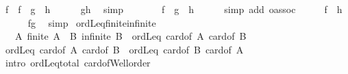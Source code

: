 \begin{isabellebody}
\ {\isachardoublequoteopen}f\ {\isacharequal}{\kern0pt}\ f\ {\isasymcirc}\ {\isacharparenleft}{\kern0pt}g\ {\isasymcirc}\ h{\isacharparenright}{\kern0pt}{\isachardoublequoteclose}\isanewline
\ \ \ \ \isamarkupfalse%
\ gh\ \isamarkupfalse%
\ simp\isanewline
\ \ \isamarkupfalse%
\ \isamarkupfalse%
\ {\isachardoublequoteopen}{\isasymdots}\ {\isacharequal}{\kern0pt}\ {\isacharparenleft}{\kern0pt}f\ {\isasymcirc}\ g{\isacharparenright}{\kern0pt}\ {\isasymcirc}\ h{\isachardoublequoteclose}\isanewline
\ \ \ \ \isamarkupfalse%
\ {\isacharparenleft}{\kern0pt}simp\ add{\isacharcolon}{\kern0pt}\ o{\isacharunderscore}{\kern0pt}assoc{\isacharparenright}{\kern0pt}\isanewline
\ \ \isamarkupfalse%
\ \isamarkupfalse%
\ {\isachardoublequoteopen}f\ {\isacharequal}{\kern0pt}\ h{\isachardoublequoteclose}\isanewline
\ \ \ \ \isamarkupfalse%
\ fg\ \isamarkupfalse%
\ simp\isanewline
{}\isamarkupfalse%
%
\endisatagproof
{\isafoldproof}%
%
\isadelimproof
\isanewline
%
\endisadelimproof
\isanewline
{}\isamarkupfalse%
\ ordLeq{}{\isacharunderscore}{\kern0pt}finite{\isacharunderscore}{\kern0pt}infinite{\isacharcolon}{\kern0pt}\isanewline
\ \ \ A{\isacharcolon}{\kern0pt}\ {\isachardoublequoteopen}finite\ A{\isachardoublequoteclose}\ \ B{\isacharcolon}{\kern0pt}\ {\isachardoublequoteopen}infinite\ B{\isachardoublequoteclose}\ \ {\isachardoublequoteopen}ordLeq{}\ {\isacharparenleft}{\kern0pt}card{\isacharunderscore}{\kern0pt}of\ A{\isacharparenright}{\kern0pt}\ {\isacharparenleft}{\kern0pt}card{\isacharunderscore}{\kern0pt}of\ B{\isacharparenright}{\kern0pt}{\isachardoublequoteclose}\isanewline
%
\isadelimproof
%
\endisadelimproof
%
\isatagproof
{}\isamarkupfalse%
\ {\isacharminus}{\kern0pt}\isanewline
\ \ \isamarkupfalse%
\ {\isacartoucheopen}ordLeq{}\ {\isacharparenleft}{\kern0pt}card{\isacharunderscore}{\kern0pt}of\ A{\isacharparenright}{\kern0pt}\ {\isacharparenleft}{\kern0pt}card{\isacharunderscore}{\kern0pt}of\ B{\isacharparenright}{\kern0pt}\ {\isasymor}\ ordLeq{}\ {\isacharparenleft}{\kern0pt}card{\isacharunderscore}{\kern0pt}of\ B{\isacharparenright}{\kern0pt}\ {\isacharparenleft}{\kern0pt}card{\isacharunderscore}{\kern0pt}of\ A{\isacharparenright}{\kern0pt}{\isacartoucheclose}\isanewline
\ \ \ \ \isamarkupfalse%
\ {\isacharparenleft}{\kern0pt}intro\ ordLeq{\isacharunderscore}{\kern0pt}total\ card{\isacharunderscore}{\kern0pt}of{\isacharunderscore}{\kern0pt}Well{\isacharunderscore}{\kern0pt}order{\isacharparenright}{\kern0pt}\isanewline

\end{isabellebody}
